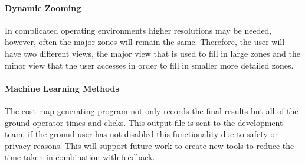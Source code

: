 \paragraph{Dynamic Zooming}
In complicated operating environments higher resolutions may be needed, however, often the major zones will remain the same. Therefore, the user will have two different views, the major view that is used to fill in large zones and the minor view that the user accesses in order to fill in smaller more detailed zones. 
\paragraph{Machine Learning Methods}
The cost map generating program not only records the final results but all of the ground operator times and clicks. This output file is sent to the development team, if the ground user has not disabled this functionality due to safety or privacy reasons. This will support future work to create new tools to reduce the time taken in combination with feedback.

